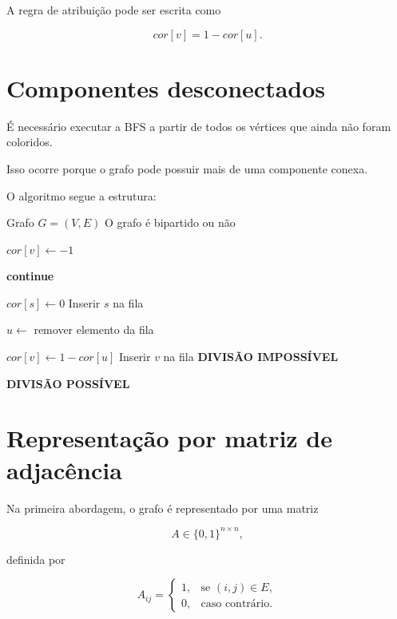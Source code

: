 \documentclass[12pt,a4paper]{article}
\begin{document}
A regra de atribuição pode ser escrita como

$$
cor[v]=1-cor[u].
$$

\section{Componentes desconectados}

É necessário executar a BFS a partir de todos os vértices que ainda
não foram coloridos.

Isso ocorre porque o grafo pode possuir mais de uma componente conexa.

O algoritmo segue a estrutura:

\begin{algorithm}
\caption{BFS para verificação de bipartição}
\begin{algorithmic}[1]

\Require Grafo $G=(V,E)$
\Ensure O grafo é bipartido ou não

\State $cor[v]\gets -1$
\EndFor

\State \textbf{continue}
\EndIf


\State $cor[s]\gets 0$
\State Inserir $s$ na fila

    \State $u\gets$ remover elemento da fila

            \State $cor[v]\gets 1-cor[u]$
            \State Inserir $v$ na fila
            \State \Return \textbf{DIVISÃO IMPOSSÍVEL}
        \EndIf
    \EndFor
\EndWhile


\EndFor

\State \Return \textbf{DIVISÃO POSSÍVEL}

\end{algorithmic}
\end{algorithm}

\section{Representação por matriz de adjacência}

Na primeira abordagem, o grafo é representado por uma matriz

$$
A\in\{0,1\}^{n\times n},
$$

definida por

$$
A_{ij}=
\begin{cases}
1,&\text{se }(i,j)\in E,\\
0,&\text{caso contrário}.
\end{cases}
$$
\end{document}
